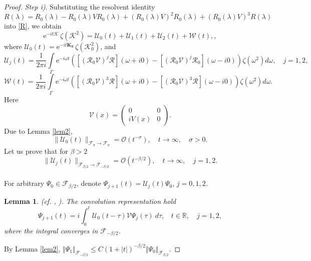 \documentclass[reqno]{amsart}
\newtheorem{lemma}[theorem]{Lemma}
\newcommand{\R}{{\mathbb R}}
\newcommand{\cF}{{\mathcal F}}
\newcommand{\cR}{{\mathcal R}}
\newcommand{\cK}{{\mathcal K}}
\newcommand{\cU}{{\mathcal U}}
\newcommand{\E}{\mathrm{e}}
\numberwithin{equation}{section}
\begin{document}
\begin{proof}
{\it Step i)}.
Substituting the  resolvent identity 
$$
R(\lambda)= R_0(\lambda)- R_0(\lambda)V R_0(\lambda)+ (R_0(\lambda)V)^2 R_0(\lambda) + (R_0(\lambda)V)^3 R(\lambda)
$$ 
into \eqref{R}, we obtain
\[
\E^{-it\cK}\,\zeta(\cK^2)=\cU_0(t)+\cU_1(t)+\cU_2(t)+{\mathcal W}(t),,
\]
where $\cU_0(t)=\E^{-it\mathbf{K_0}}\,\zeta(\cK_0^2)$, and
\begin{equation*}
\cU_j(t)=\frac 1{2\pi i}\int\limits_{\Gamma}\! \E^{-i\omega t}
([(\cR_0{\mathcal V})^j\cR](\omega+i0)-[(\cR_0{\mathcal V})^j\cR_0](\omega-i0))\zeta(\omega^2) d\omega, \quad j=1,2,
\end{equation*}
\begin{equation*}
{\mathcal W}(t)=\frac 1{2\pi i}\int\limits_{\Gamma}\! \E^{-i\omega t}
([(\cR_0{\mathcal V})^3\cR](\omega+i0)-[(\cR_0{\mathcal V})^3\cR](\omega-i0))\zeta(\omega^2) d\omega.
\end{equation*}
Here
\begin{equation}\label{cV}
{\mathcal V}(x)=\left(\begin{array}{cc}
  0               &   0
  \\
  iV(x)   &   0
  \end{array}\right).
\end{equation}
Due to Lemma \ref{lem2}, 
\begin{equation}\label{U0}
\big\| \cU_0(t)\big\|_{{\mathcal F}_{\sigma}\to {\mathcal F}_{\sigma}}
={\mathcal O}(t^{-\sigma}),\quad t\to \infty,\quad \sigma>0.
\end{equation}
Let us prove that for $\beta>2$ %
\begin{equation}\label{U1}
\big\| \cU_j(t)\big\|_{{\mathcal F}_{\beta/2}\to {\mathcal F}_{-\beta/2}}
={\mathcal O}(t^{-\beta/2}),\quad t\to \infty,\quad j=1,2.
\end{equation}
\smallskip\\
For arbitrary  $\Psi_0\in {\mathcal F}_{\beta/2}$, denote  $\Psi_{j+1}(t)=\cU_j(t)\Psi_0$, $j=0,1,2$.
\begin{lemma}(cf. \cite[Lemma 3.8]{KK10}, \cite[Lemma 36.6]{KK12}). 
The convolution representation hold
\begin{equation}\label{conv}
\Psi_{j+1}(t)=
 i\int_0^t \cU_0(t-\tau){\mathcal V} \Psi_j(\tau)~d\tau,~~~~t\in\R,\quad j=1,2,
\end{equation}
where the integral converges in ${\mathcal F}_{-\beta/2}$.
\end{lemma}
By Lemma \ref{lem2},
$\Vert\Psi_1\Vert_{\cF_{-\beta/2}}\le C (1+|t|)^{-\beta/2}\Vert \Psi_0\Vert_{\cF_{\beta/2}}$.

\end{proof}
\end{document}
